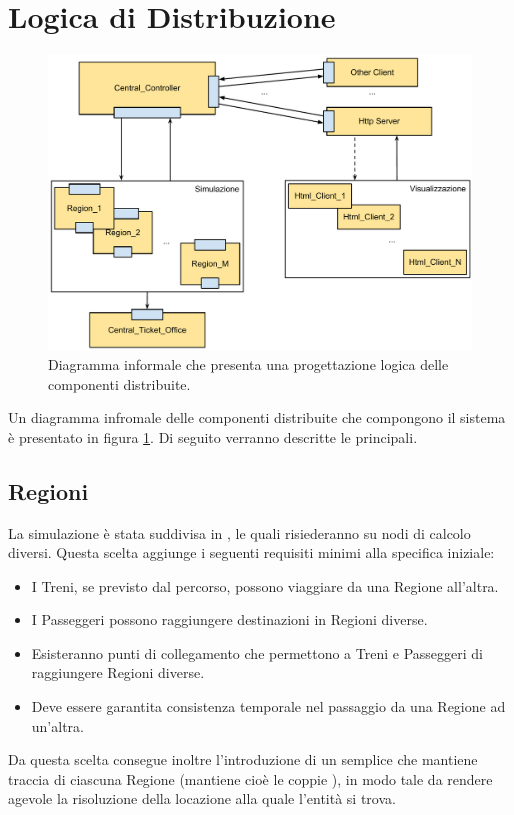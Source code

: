 \section{Logica di Distribuzione}

	\begin{figure}[htbp]
		\begin{center}
			\includegraphics[width=\textwidth,keepaspectratio]{imgs/logic_distribution.pdf}
			\caption{\footnotesize{Diagramma informale che presenta una progettazione logica delle componenti distribuite.}}
			\label{fig:logic_distribution}
		\end{center}
	\end{figure}

Un diagramma infromale delle componenti distribuite che compongono il sistema è presentato in figura \ref{fig:logic_distribution}. Di seguito verranno descritte le principali.
	
	\subsection{Regioni}\label{sec:distr_regioni}
	
	La simulazione è stata suddivisa in , le quali risiederanno su nodi di calcolo diversi. Questa scelta aggiunge i seguenti requisiti minimi alla specifica iniziale:
	\begin{itemize}
		\item I Treni, se previsto dal percorso, possono viaggiare da una Regione all'altra.
		\item I Passeggeri possono raggiungere destinazioni in Regioni diverse.
		\item Esisteranno punti di collegamento che permettono a Treni e Passeggeri di raggiungere Regioni diverse. 
		\item Deve essere garantita consistenza temporale nel passaggio da una Regione ad un'altra.
	\end{itemize}
	Da questa scelta consegue inoltre l'introduzione di un semplice  che mantiene traccia di ciascuna Regione (mantiene cioè le coppie ), in modo tale da rendere agevole la risoluzione della locazione alla quale l'entità si trova. 
	
